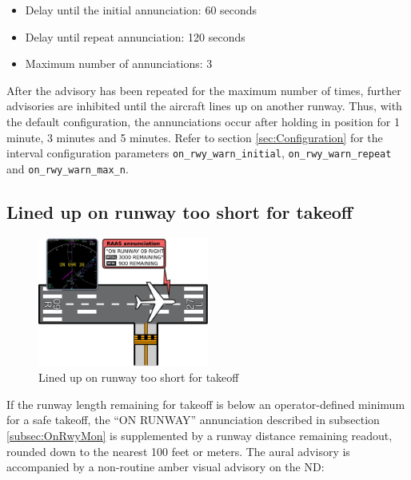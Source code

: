 \documentclass[a4paper,12pt]{article}
\newcommand{\confopt}[1]{\texttt{#1}}
\begin{document}
\begin{itemize}

\item Delay until the initial annunciation: 60 seconds

\item Delay until repeat annunciation: 120 seconds

\item Maximum number of annunciations: 3

\end{itemize}

\noindent After the advisory has been repeated for the maximum number of
times, further advisories are inhibited until the aircraft lines up on
another runway. Thus, with the default configuration, the annunciations
occur after holding in position for 1 minute, 3 minutes and 5 minutes.
Refer to section \ref{sec:Configuration} for the interval configuration
parameters
\confopt{on\_rwy\_warn\_initial},
\confopt{on\_rwy\_warn\_repeat} and \confopt{on\_rwy\_warn\_max\_n}.

\newpage
\subsection{Lined up on runway too short for takeoff}
\label{subsec:OnRwyShortMon}

\begin{figure}
\vspace{-2em}
\begin{center}
\includegraphics[width=0.5\textwidth]{../src/on_rwy_short.pdf}
\end{center}
\caption{Lined up on runway too short for takeoff}
\vspace{-2em}
\end{figure}

If the runway length remaining for takeoff is below an operator-defined
minimum for a safe takeoff, the ``ON RUNWAY'' annunciation described in
subsection \ref{subsec:OnRwyMon} is supplemented by a runway distance
remaining readout, rounded down to the nearest 100 feet or meters. The
aural advisory is accompanied by a non-routine amber visual advisory on
the ND:
\end{document}

